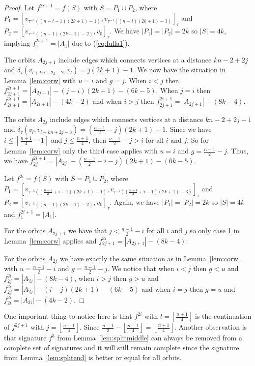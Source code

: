 \documentclass[11pt,a4paper]{article}
\begin{document}
\begin{proof}
Let $f^{2i+1} = f(S)$ with $S = P_1 \cup P_2$,
where
$P_1= [v_{\tau^{-1}((n-i-1)(2k+1)-1)},v_{\tau^{-1}((n-i)(2k+1)-3)}]_{\tau}$
and
$P_2 = [v_{\tau^{-1}((n-1)(2k+1)-2)},v_0]_{\tau}$.
We have $|P_1|=|P_2|=2k$ so $|S| = 4k$, implying $f^{2i+1}_1=|A_1|$ due to (\ref{eq:fulla1}).

The orbits $A_{2j+1}$ include edges which connects vertices at a distance $kn-2+2j$ and
$\delta_{\tau}(v_{l+kn+2j-2},v_l) = j(2k+1)-1$. We now have the situation in Lemma~\ref{lem:corw} with $u=i$ and $g=j$. When $i<j$ then $f^{2i+1}_{2j+1}=|A_{2j+1}|-(j-i)(2k+1)-(6k-5)$. When $j=i$ then $f^{2i+1}_{2i+1} = |A_{2i+1}|-(4k-2)$ and when $i>j$ then $f^{2i+1}_{2j+1} = |A_{2j+1}|-(8k-4)$.

The orbits $A_{2j}$ include edges which connects vertices at a distance $kn-2+2j-1$ and 
$\delta_{\tau}(v_l,v_{l+kn+2j-3}) = (\frac{n-1}{2}-j)(2k+1)-1$. Since we have $i \leq \left\lceil\frac{n+1}{4}-1\right\rceil$ and $j \leq \frac{n+1}{4}$, then $\frac{n-1}{2}-j > i$ for all $i$ and $j$. So for Lemma~\ref{lem:corw} only the third case applies with $u=i$ and $g = \frac{n-1}{2}-j$. Thus, we have $f^{2i+1}_{2j} = |A_{2j}|-(\frac{n-1}{2}-i-j)(2k+1)-(6k-5)$.

Let $f^{2i} = f(S)$ with 
$S = P_1 \cup P_2$, where
$P_1= [v_{\tau^{-1}((\frac{n-1}{2}+i-1)(2k+1)-1)},v_{\tau^{-1}((\frac{n-1}{2}+i-1)(2k+1)-3)}]_{\tau}$
and
$P_2 = [v_{\tau^{-1}((n-1)(2k+1)-2)},v_0]_{\tau}$.
Again, we have $|P_1|=|P_2|=2k$ so $|S| = 4k$ and $f^{2i+1}_1=|A_1|$.

For the orbits $A_{2j+1}$ we have that $j < \frac{n-1}{2}-i$ for all $i$ and $j$ so only case 1 in Lemma~\ref{lem:corw} applies and $f^{2i}_{2j+1}=|A_{2j+1}|-(8k-4)$.

For the orbits $A_{2j}$ we have exactly the same situation as in Lemma~\ref{lem:corw} with $u = \frac{n-1}{2}-i$ and $g = \frac{n-1}{2}-j$. We notice that when $i<j$ then $g<u$ and  $f^{2i}_{2j}=|A_{2j}|-(8k-4)$, when $i>j$ then $g>u$ and $f^{2i}_{2j}=|A_{2j}|-(i-j)(2k+1)-(6k-5)$ and when $i=j$ then $g=u$ and $f^{2i}_{2i} = |A_{2i}|-(4k-2)$.
\end{proof}

One important thing to notice here is that $f^{2i}$ with $l= \left\lfloor\frac{n+1}{4}\right\rfloor$ is the continuation of $f^{2j+1}$ with $j = \left\lfloor\frac{n-1}{4}\right\rfloor$. Since $\frac{n-1}{2}-\left\lfloor\frac{n-1}{4}\right\rfloor=\left\lfloor\frac{n+1}{4}\right\rfloor$. Another observation is that signature $f^{3}$ from Lemma~\ref{lem:splitmiddle} can always be removed from a complete set of signatures and it will still remain complete since the signature from Lemma~\ref{lem:splitend} is better or equal for all orbits. 
\end{document}
